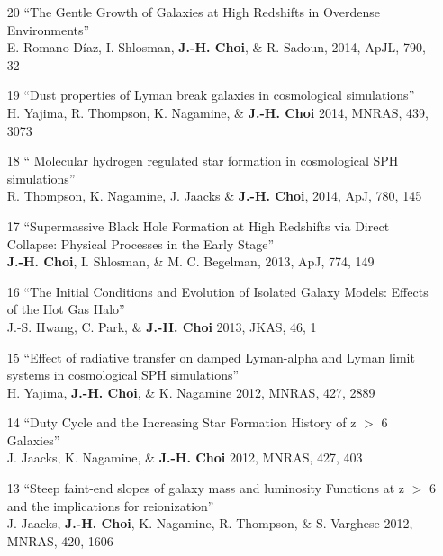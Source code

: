 \documentclass [11pt]{article}
\begin{document}
{{\begin{enumerate}
\item[20] ``The Gentle Growth of Galaxies at High Redshifts in Overdense Environments'' \\  E. Romano-D\'{i}az, I. Shlosman, \textbf{J.-H. Choi}, \& R. Sadoun, 2014, ApJL, 790, 32

\item[19]``Dust properties of Lyman break galaxies in cosmological simulations'' \\ H. Yajima, R. Thompson, K. Nagamine, \& \textbf{J.-H. Choi} 2014, MNRAS, 439, 3073

\item[18]`` Molecular hydrogen regulated star formation in cosmological SPH simulations'' \\ R. Thompson, K. Nagamine, J. Jaacks \& \textbf{J.-H. Choi}, 2014, ApJ, 780, 145

\item[17] ``Supermassive Black Hole Formation at High Redshifts  via Direct Collapse: Physical Processes in the Early Stage'' \\ \textbf{J.-H. Choi}, I. Shlosman, \& M. C. Begelman, 2013, ApJ, 774, 149

\item[16]``The Initial Conditions and Evolution of Isolated Galaxy Models: Effects of the Hot Gas Halo'' \\ J.-S. Hwang, C. Park, \& \textbf{J.-H. Choi} 2013, JKAS, 46, 1

\item[15]``Effect of radiative transfer on damped Lyman-alpha and Lyman limit systems in cosmological SPH simulations''\\ H. Yajima, \textbf{J.-H. Choi}, \& K. Nagamine 2012, MNRAS, 427, 2889

\item[14]``Duty Cycle and the Increasing Star Formation History of z $>$ 6 Galaxies''\\ J. Jaacks, K. Nagamine, \& \textbf{J.-H. Choi} 2012, MNRAS, 427, 403

\item[13]``Steep faint-end slopes of galaxy mass and luminosity Functions at z $>$ 6 and the implications for reionization''\\ J. Jaacks, \textbf{J.-H. Choi}, K. Nagamine, R. Thompson, \& S. Varghese 2012, MNRAS, 420, 1606 


\end{enumerate}}}
\end{document}
